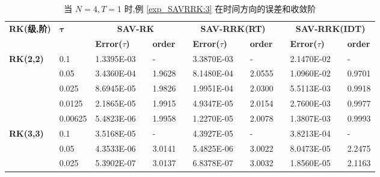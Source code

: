 \documentclass[aspectratio=169]{beamer}
\numberwithin{theorem}{section} %
\numberwithin{equation}{section}%
\numberwithin{figure}{section}%
\numberwithin{table}{section}%
\begin{document}
\begin{frame}%
	\begin{table}[H]\scriptsize
		\centering
		\caption{当 $N=4, T = 1$ 时,例 \ref{exp_SAVRRK:3} 在时间方向的误差和收敛阶}
		\begin{tabular}{lllllrlrlrlrlrl}
		\toprule
		\multicolumn{2}{l}{\multirow{2}[3]{*}{\textbf{RK(级,阶)}}} & \multicolumn{2}{l}{\multirow{2}[3]{*}{$\bm{\tau}$}} & \multicolumn{3}{c}{\textbf{SAV-RK}} &       & \multicolumn{3}{c}{\textbf{SAV-RRK(RT)}} &       & \multicolumn{3}{c}{\textbf{SAV-RRK(IDT)}} \\
		\cmidrule{5-7}\cmidrule{9-11}\cmidrule{13-15}    \multicolumn{2}{l}{} & \multicolumn{2}{l}{} & \textbf{Error($\tau$)} &       & \textbf{order} &       & \textbf{Error($\tau$)} &       & \textbf{order} &       & \textbf{Error($\tau$)} &       & \textbf{order} \\
		\hline
		\multicolumn{2}{l}{\multirow{5}[0]{*}{\textbf{RK(2,2)}}} & \multicolumn{2}{l}{0.1} & 1.3395E-03 &       & -     &       & 3.3870E-03 &       & -     &       & 2.1470E-02 &       & - \\
		\multicolumn{2}{l}{} & \multicolumn{2}{l}{0.05} & 3.4360E-04 &       & 1.9628  &       & 8.1480E-04 &       & 2.0555  &       & 1.0960E-02 &       & 0.9701  \\
		\multicolumn{2}{l}{} & \multicolumn{2}{l}{0.025} & 8.6945E-05 &       & 1.9826  &       & 1.9951E-04 &       & 2.0300  &       & 5.5113E-03 &       & 0.9918  \\
		\multicolumn{2}{l}{} & \multicolumn{2}{l}{0.0125} & 2.1865E-05 &       & 1.9915  &       & 4.9347E-05 &       & 2.0154  &       & 2.7600E-03 &       & 0.9977  \\
		\multicolumn{2}{l}{} & \multicolumn{2}{l}{0.00625} & 5.4823E-06 &       & 1.9958  &       & 1.2270E-05 &       & 2.0078  &       & 1.3807E-03 &       & 0.9993  \\
		\multicolumn{2}{l}{\multirow{5}[0]{*}{\textbf{RK(3,3)}}} & \multicolumn{2}{l}{0.1} & 3.5168E-05 &       & -     &       & 4.3927E-05 &       & -     &       & 3.8213E-04 &       & - \\
		\multicolumn{2}{l}{} & \multicolumn{2}{l}{0.05} & 4.3533E-06 &       & 3.0141  &       & 5.4825E-06 &       & 3.0022  &       & 8.0473E-05 &       & 2.2475  \\
		\multicolumn{2}{l}{} & \multicolumn{2}{l}{0.025} & 5.3902E-07 &       & 3.0137  &       & 6.8378E-07 &       & 3.0032  &       & 1.8560E-05 &       & 2.1163  \\

\end{tabular}
\end{table}
\end{frame}
\end{document}
